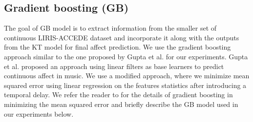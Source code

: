 \documentclass{article}
\begin{document}

\subsection{Gradient boosting (GB)}


The goal of GB model is to extract information from the smaller set of continuous LIRIS-ACCEDE dataset and incorporate it along with the outputs from the KT model for final affect prediction.
We use the gradient boosting approach similar to the one proposed by Gupta et al. \cite{gupta2015affect} for our experiments.
Gupta et al. \cite{gupta2015affect} proposed an approach using linear filters as base learners to predict continuous affect in music. 
We use a modified approach, where we minimize mean squared error using linear regression on the features statistics after introducing a temporal delay.
We refer the reader to \cite{friedman2001greedy,gupta2015affect} for the details of gradient boosting in minimizing the mean squared error and briefly describe the GB model used in our experiments below. 
\end{document}
